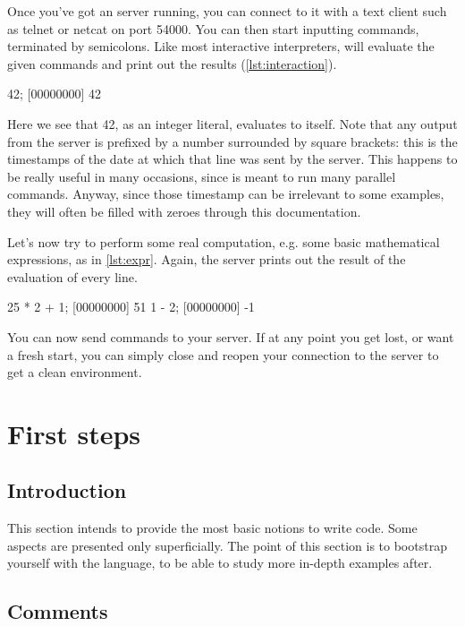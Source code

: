 \documentclass[openright,twoside,12pt]{report}
\begin{document}
Once you've got an \urbi server running, you can connect to it with a
text client such as telnet or netcat on port 54000. You can then start
inputting commands, terminated by semicolons. Like most interactive
interpreters, \urbi will evaluate the given commands and print out the
results (\autoref{lst:interaction}).

\begin{urbiscript}[caption=Evaluating literal values,label=lst:interaction]
42;
[00000000] 42
\end{urbiscript}

Here we see that 42, as an integer literal, evaluates to itself. Note
that any output from the server is prefixed by a number surrounded by
square brackets: this is the timestamps of the date at which that line
was sent by the server. This happens to be really useful in many
occasions, since \urbi is meant to run many parallel commands. Anyway,
since those timestamp can be irrelevant to some examples, they will
often be filled with zeroes through this documentation.

Let's now try to perform some real computation, e.g. some basic
mathematical expressions, as in \autoref{lst:expr}. Again, the server prints
out the result of the evaluation of every line.

\begin{urbiscript}[caption=Evaluating composite expressions,label=lst:expr]
25 * 2 + 1;
[00000000] 51
1 - 2;
[00000000] -1
\end{urbiscript}

You can now send commands to your \urbi server. If at any point you
get lost, or want a fresh start, you can simply close and reopen your
connection to the server to get a clean environment.

\chapter{First steps}

\section{Introduction}

This section intends to provide the most basic notions to write \urbi
code. Some aspects are presented only superficially. The point of this
section is to bootstrap yourself with the \urbi language, to be able
to study more in-depth examples after.

\section{Comments}
\end{document}
